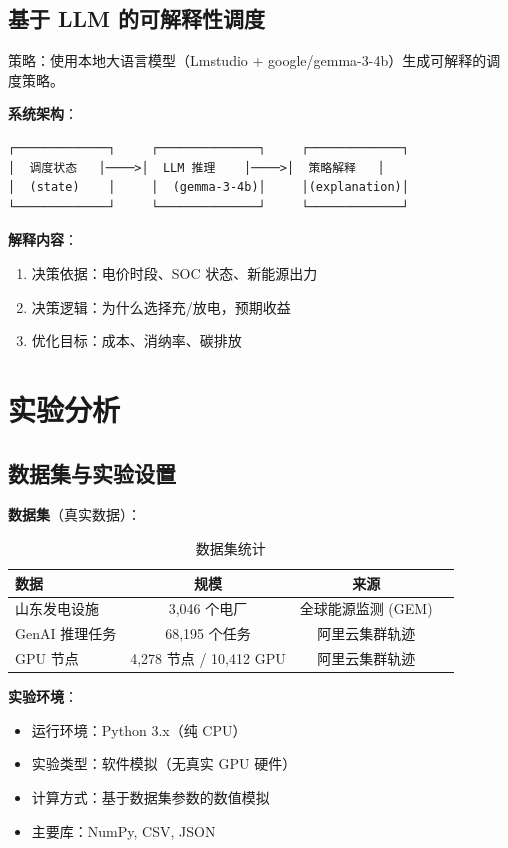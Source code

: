 \documentclass[12pt,a4paper]{article}
\begin{document}
\subsection{基于 LLM 的可解释性调度}

策略：使用本地大语言模型（Lmstudio + google/gemma-3-4b）生成可解释的调度策略。

\textbf{系统架构}：
\begin{verbatim}
┌─────────────┐     ┌──────────────┐     ┌─────────────┐
│  调度状态   │────>│  LLM 推理    │────>│  策略解释   │
│  (state)    │     │  (gemma-3-4b)│     │(explanation)│
└─────────────┘     └──────────────┘     └─────────────┘
\end{verbatim}

\textbf{解释内容}：
\begin{enumerate}
    \item 决策依据：电价时段、SOC 状态、新能源出力
    \item 决策逻辑：为什么选择充/放电，预期收益
    \item 优化目标：成本、消纳率、碳排放
\end{enumerate}

\section{实验分析}
\label{sec:exp}

\subsection{数据集与实验设置}

\textbf{数据集}（真实数据）：

\begin{table}[h]
\centering
\caption{数据集统计}
\label{tab:dataset}
\begin{tabular}{@{}lccc@{}}
\toprule
\textbf{数据} & \textbf{规模} & \textbf{来源} \\
\midrule
山东发电设施 & 3,046 个电厂 & 全球能源监测 (GEM) \\
GenAI 推理任务 & 68,195 个任务 & 阿里云集群轨迹 \\
GPU 节点 & 4,278 节点 / 10,412 GPU & 阿里云集群轨迹 \\
\bottomrule
\end{tabular}
\end{table}

\textbf{实验环境}：
\begin{itemize}
    \item 运行环境：Python 3.x（纯 CPU）
    \item 实验类型：软件模拟（无真实 GPU 硬件）
    \item 计算方式：基于数据集参数的数值模拟
    \item 主要库：NumPy, CSV, JSON
\end{itemize}
\end{document}
